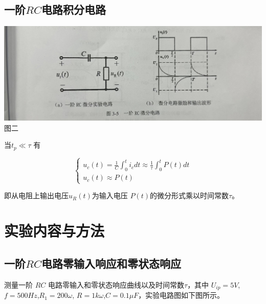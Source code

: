 \documentclass[a4paper]{article}
\begin{document}
    \subsection{一阶$RC$电路积分电路}\label{subsec:$rc$3}
    \begin{center}
        \includegraphics[scale=0.09]{3}\\
        {\small 图二}
    \end{center}

    {{当$t_{p}\ll\tau$ 有}}

    \begin{equation}
        \left\{
        \begin{array}{c}
            u_{c}(t)=\frac{1}{C} \int_{0}^{t} i_{c} d t \approx \frac{1}{\tau} \int_{0}^{t} P(t) d t\\
            u_{c}(t)\approx P(t)
        \end{array}
        \right.\label{eq:equation4}
    \end{equation}

    {{即从电阻上输出电压$u_{R}(t)$为输入电压 $P(t)$的微分形式乘以时间常数$\tau$。}}

    \vspace{1cm}


    \section{实验内容与方法}\label{sec:3}

    \subsection{一阶$RC$电路零输入响应和零状态响应}
    {测量一阶 $RC$ 电路零输入和零状态响应曲线以及时间常数$\tau$，其中 $U_{ip}=5V$,$f=500Hz$,$R_{1} =
    200\omega$, $R = 1k\omega$,$C = 0.1\mu F$，实验电路图如下图所示。}\label{subsec:$rc$4}
\end{document}

